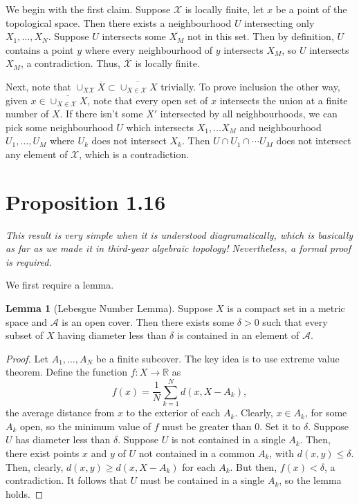 \documentclass[aps,pra,showpacs,notitlepage,onecolumn,superscriptaddress,nofootinbib]{revtex4-1}
\theoremstyle{definition}
\newtheorem{lemma}{Lemma}[section]
\begin{document}
\noindent
We begin with the first claim. Suppose $\mathcal{X}$ is locally finite, let $x$ be a point of the topological space. Then there exists a neighbourhood $U$ intersecting only $X_1, \dots, X_N$. Suppose $U$ intersects
some $\overline{X_M}$ not in this set. Then by definition, $U$ contains a point $y$ where every neighbourhood of $y$ intersects $X_M$, so $U$ intersects $X_M$, a contradiction. Thus, $\overline{\mathcal{X}}$ is locally finite.

Next, note that $\cup_{X \mathcal{X}} \overline{X} \subset \overline{\cup_{X \in \mathcal{X}} X}$ trivially. To prove inclusion the other way, given $x \in \overline{\cup_{X \in \mathcal{X}} X}$, note that every open set of $x$ intersects the union at a finite number of $X$. If there isn't some $X'$ intersected by all neighbourhoods, we can pick some neighbourhood $U$ which intersects $X_1, \dots X_M$ and neighbourhood $U_1, \dots, U_M$ where $U_k$ does not intersect $X_k$. Then $U \cap U_1 \cap \cdots U_M$ does not intersect any element of $\mathcal{X}$, which is a contradiction.

\hrulefill

\section{Proposition 1.16}

\noindent
\textit{This result is very simple when it is understood diagramatically, which is basically as far as we made it in third-year algebraic topology! Nevertheless, a formal proof is required.}
\newline

\noindent
We first require a lemma.
\begin{lemma}[Lebesgue Number Lemma]
Suppose $X$ is a compact set in a metric space and $\mathcal{A}$ is an open cover. Then there exists some $\delta > 0$ such that every subset of $X$ having diameter less than $\delta$ is contained in an element of $\mathcal{A}$.
\end{lemma}
\begin{proof}
  Let $A_1, \dots, A_N$ be a finite subcover. The key idea is to use extreme value theorem. Define the function $f : X \rightarrow \mathbb{R}$ as
  \begin{equation}
    f(x) = \frac{1}{N} \displaystyle\sum_{k = 1}^{N} d(x, X - A_k),
    \end{equation}
  the average distance from $x$ to the exterior of each $A_k$. Clearly, $x \in A_k$, for some $A_k$ open, so the minimum value of $f$ must be greater than $0$. Set it to $\delta$. Suppose $U$ has diameter less than
  $\delta$. Suppose $U$ is not contained in a single $A_k$. Then, there exist points $x$ and $y$ of $U$ not contained in a common $A_k$, with $d(x, y) \leq \delta$. Then, clearly, $d(x, y) \geq d(x, X - A_k)$ for each $A_k$.
  But then, $f(x) < \delta$, a contradiction. It follows that $U$ must be contained in a single $A_k$, so the lemma holds.
  \end{proof}
\end{document}
